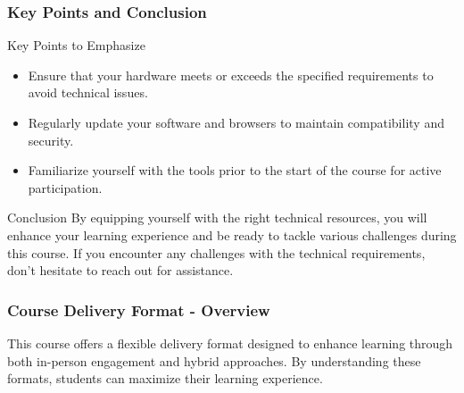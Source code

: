 \documentclass[aspectratio=169]{beamer}
\begin{document}
\begin{frame}[fragile]
    \frametitle{Key Points and Conclusion}
    \begin{block}{Key Points to Emphasize}
        \begin{itemize}
            \item Ensure that your hardware meets or exceeds the specified requirements to avoid technical issues.
            \item Regularly update your software and browsers to maintain compatibility and security.
            \item Familiarize yourself with the tools prior to the start of the course for active participation.
        \end{itemize}
    \end{block}
    \begin{block}{Conclusion}
        By equipping yourself with the right technical resources, you will enhance your learning experience and be ready to tackle various challenges during this course. If you encounter any challenges with the technical requirements, don't hesitate to reach out for assistance.
    \end{block}
\end{frame}

\begin{frame}[fragile]
    \frametitle{Course Delivery Format - Overview}
    This course offers a flexible delivery format designed to enhance learning through both in-person engagement and hybrid approaches. By understanding these formats, students can maximize their learning experience.
\end{frame}
\end{document}
